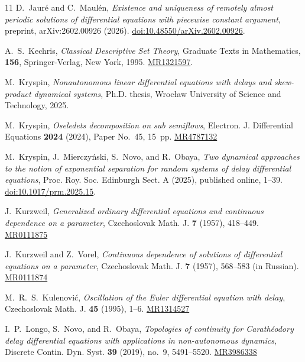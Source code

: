 \documentclass[reqno]{amsart}
\theoremstyle{plain}
\numberwithin{equation}{section}
\numberwithin{definition}{section}
\begin{document}
\begin{thebibliography}{11}
D.~Jaur\'e and C.~Maul\'en,
\emph{Existence and uniqueness of remotely almost periodic solutions
of differential equations with piecewise constant argument},
preprint, arXiv:2602.00926 (2026).
\href{https://doi.org/10.48550/arXiv.2602.00926}
{doi:10.48550/arXiv.2602.00926}.

A.~S.~Kechris,
\emph{Classical Descriptive Set Theory},
Graduate Texts in Mathematics, \textbf{156},
Springer-Verlag, New York, 1995.
\href{https://mathscinet.ams.org/mathscinet-getitem?mr=1321597}
{MR1321597}.

M.~Kryspin,
\emph{Nonautonomous linear differential equations with delays
and skew-product dynamical systems},
Ph.D. thesis, Wroc{\l}aw University of Science and Technology, 2025.

M.~Kryspin, \emph{Oseledets decomposition on sub semiflows},
Electron. J. Differential Equations \textbf{2024} (2024),
Paper No.~45, 15~pp.
\href{https://mathscinet.ams.org/mathscinet-getitem?mr=4787132}{MR4787132}

M.~Kryspin, J.~Mierczy\'nski, S.~Novo, and R.~Obaya,
\emph{Two dynamical approaches to the notion of exponential separation
for random systems of delay differential equations},
Proc. Roy. Soc. Edinburgh Sect. A (2025),
published online, 1--39.
\href{https://doi.org/10.1017/prm.2025.15}
{doi:10.1017/prm.2025.15}.

J.~Kurzweil,
\emph{Generalized ordinary differential equations and
continuous dependence on a parameter},
Czechoslovak Math. J. \textbf{7} (1957), 418--449. \href{https://mathscinet.ams.org/mathscinet-getitem?mr=111875}{MR0111875}

J.~Kurzweil and Z.~Vorel,
\emph{Continuous dependence of solutions of differential
equations on a parameter},
Czechoslovak Math. J. \textbf{7} (1957), 568--583
(in Russian). \href{https://mathscinet.ams.org/mathscinet-getitem?mr=111874}{MR0111874}

M.~R.~S.~Kulenovi\'c,
\emph{Oscillation of the Euler differential equation with delay},
Czechoslovak Math. J. \textbf{45} (1995), 1--6.
\href{https://mathscinet.ams.org/mathscinet-getitem?mr=1314527}
{MR1314527}

I.~P.~Longo, S.~Novo, and R.~Obaya,
\emph{Topologies of continuity for Carath\'eodory delay differential
equations with applications in non-autonomous dynamics},
Discrete Contin. Dyn. Syst. \textbf{39} (2019), no.~9, 5491--5520.
\href{https://mathscinet.ams.org/mathscinet-getitem?mr=3986338}
{MR3986338}


\end{thebibliography}
\end{document}
